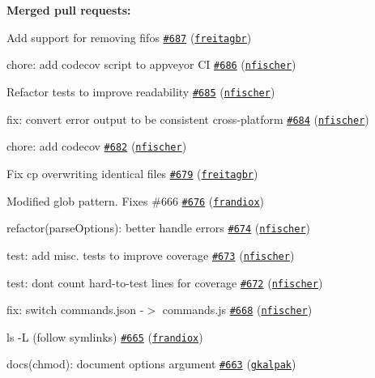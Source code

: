{\bfseries Merged pull requests\+:}


\begin{DoxyItemize}
\item Add support for removing fifos \href{https://github.com/shelljs/shelljs/pull/687}{\tt \#687} (\href{https://github.com/freitagbr}{\tt freitagbr})
\item chore\+: add codecov script to appveyor CI \href{https://github.com/shelljs/shelljs/pull/686}{\tt \#686} (\href{https://github.com/nfischer}{\tt nfischer})
\item Refactor tests to improve readability \href{https://github.com/shelljs/shelljs/pull/685}{\tt \#685} (\href{https://github.com/nfischer}{\tt nfischer})
\item fix\+: convert error output to be consistent cross-\/platform \href{https://github.com/shelljs/shelljs/pull/684}{\tt \#684} (\href{https://github.com/nfischer}{\tt nfischer})
\item chore\+: add codecov \href{https://github.com/shelljs/shelljs/pull/682}{\tt \#682} (\href{https://github.com/nfischer}{\tt nfischer})
\item Fix cp overwriting identical files \href{https://github.com/shelljs/shelljs/pull/679}{\tt \#679} (\href{https://github.com/freitagbr}{\tt freitagbr})
\item Modified glob pattern. Fixes \#666 \href{https://github.com/shelljs/shelljs/pull/676}{\tt \#676} (\href{https://github.com/frandiox}{\tt frandiox})
\item refactor(parse\+Options)\+: better handle errors \href{https://github.com/shelljs/shelljs/pull/674}{\tt \#674} (\href{https://github.com/nfischer}{\tt nfischer})
\item test\+: add misc. tests to improve coverage \href{https://github.com/shelljs/shelljs/pull/673}{\tt \#673} (\href{https://github.com/nfischer}{\tt nfischer})
\item test\+: don\textquotesingle{}t count hard-\/to-\/test lines for coverage \href{https://github.com/shelljs/shelljs/pull/672}{\tt \#672} (\href{https://github.com/nfischer}{\tt nfischer})
\item fix\+: switch commands.\+json -\/$>$ commands.\+js \href{https://github.com/shelljs/shelljs/pull/668}{\tt \#668} (\href{https://github.com/nfischer}{\tt nfischer})
\item ls -\/L (follow symlinks) \href{https://github.com/shelljs/shelljs/pull/665}{\tt \#665} (\href{https://github.com/frandiox}{\tt frandiox})
\item docs(chmod)\+: document {\ttfamily options} argument \href{https://github.com/shelljs/shelljs/pull/663}{\tt \#663} (\href{https://github.com/gkalpak}{\tt gkalpak})

\end{DoxyItemize}
